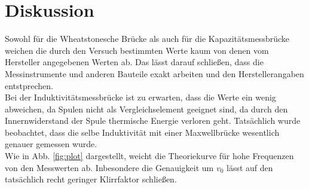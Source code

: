 \section{Diskussion}
\label{sec:Diskussion}

Sowohl für die Wheatstonesche Brücke als auch für die Kapazitätsmessbrücke weichen 
die durch den Versuch bestimmten Werte kaum von denen vom Hersteller angegebenen Werten
ab. Das lässt darauf schließen, dass die Messinstrumente und anderen Bauteile 
exakt arbeiten und den Herstellerangaben entstprechen.\\
Bei der Induktivitätsmessbrücke ist zu erwarten, dass die Werte ein wenig abweichen, da
Spulen nicht als Vergleichselement geeignet sind, da durch den Innernwiderstand der Spule
thermische Energie verloren geht. Tatsächlich wurde beobachtet, dass
die selbe Induktivität mit einer Maxwellbrücke wesentlich genauer gemessen wurde.\\
Wie in Abb. \ref{fig:plot} dargestellt, weicht die Theoriekurve für hohe Frequenzen
von den Messwerten ab. Inbesondere die Genauigkeit um $v_0$ lässt auf den tatsächlich recht
geringer Klirrfaktor schließen. 